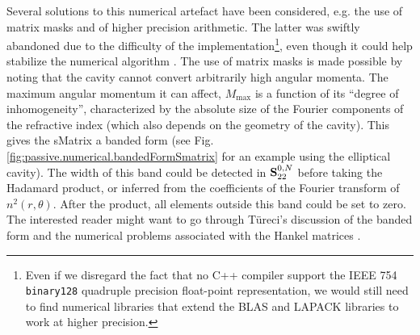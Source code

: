 Several solutions to this numerical artefact have been considered, e.g. the use of matrix masks
and of higher precision arithmetic. The latter was swiftly abandoned
due to the difficulty of the implementation\footnote{Even if we disregard
the fact that no C++ compiler support the IEEE 754 \texttt{binary128}
quadruple precision float-point representation, we would still need
to find numerical libraries that extend the BLAS and LAPACK libraries
to work at higher precision.}, even though it could help stabilize the
numerical algorithm \cite[\S 5.8.4]{MIS2002}. The use of matrix masks is 
made possible by noting that the cavity cannot convert arbitrarily
high angular momenta. The maximum angular momentum it can affect, 
$M_\text{max}$ is a function of its ``degree of inhomogeneity'', 
characterized by the absolute size of the Fourier components
of the refractive index (which also depends on the geometry
of the cavity). This gives the \gls{sMatrix} a banded form 
(see Fig. \ref{fig:passive.numerical.bandedFormSmatrix} for
an example using the elliptical cavity). The width of
this band could be detected in $\mathbf{S}^{0,N}_{22}$ before
taking the Hadamard product, or inferred from the coefficients
of the Fourier transform of $n^2(r,\theta)$. After the product, all elements
outside this band could be set to zero. The interested 
reader might want to go through Türeci's discussion of
the banded form and the numerical problems associated 
with the Hankel matrices \cite[\S 3.4]{TUR2003}.


